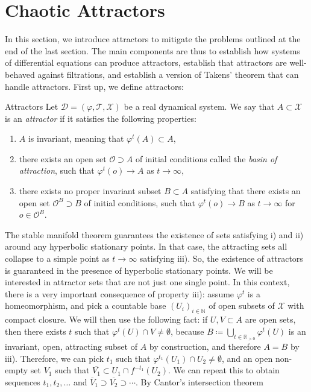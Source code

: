 \documentclass[11pt, a4paper]{memoir}
\theoremstyle{break}
\theoremstyle{break}
\theoremstyle{nonumberplain}
\newcommand{\mN}{\mathbb{N}}
\newcommand{\mR}{\mathbb{R}}
\begin{document}
\section{Chaotic Attractors}
In this section, we introduce attractors to mitigate the problems outlined at the end of the last section. The main components are thus to establish how systems of differential equations can produce attractors, establish that attractors are well-behaved against filtrations, and establish a version of Takens' theorem that can handle attractors. First up, we define attractors:
\begin{mydefinition}{Attractors}
Let $\mathcal{D}=(\varphi,\mathcal{T},\mathcal{X})$ be a real dynamical system. We say that $A\subset \mathcal{X}$ is an \emph{attractor} if it satisfies the following properties:
\begin{enumerate}[label=\roman*)]
	\item $A$ is invariant, meaning that $\varphi^t(A)\subset A$,
	\item there exists an open set $\mathcal{O}\supset A$ of initial conditions called the \emph{basin of attraction}, such that $\varphi^t(o)\to A$ as $t\to \infty$,
	\item there exists no proper invariant subset $B\subset A$ satisfying that there exists an open set $\mathcal{O}^B\supset B$ of initial conditions, such that $\varphi^t(o)\to B$ as $t\to \infty$ for $o\in \mathcal{O}^B$.
\end{enumerate}
\end{mydefinition}
The stable manifold theorem guarantees the existence of sets satisfying i) and ii) around any hyperbolic stationary points. In that case, the attracting sets all collapse to a simple point as $t\to\infty$ satisfying iii). So, the existence of attractors is guaranteed in the presence of hyperbolic stationary points. We will be interested in attractor sets that are not just one single point. In this context, there is a very important consequence of property iii): assume $\varphi^t$ is a homeomorphism, and pick a countable base $(U_i)_{i\in \mN}$ of open subsets of $\mathcal{X}$ with compact closure. We will then use the following fact: if $U,V\subset A$ are open sets, then there exists $t$ such that $\varphi^{t}(U)\cap V\neq \emptyset$, because $B\coloneqq \bigcup_{t\in \mR_{>0}}\varphi^{t}(U)$ is an invariant, open, attracting subset of $A$ by construction, and therefore $A=B$ by iii). Therefore, we can pick $t_1$ such that $\varphi^{t_1}(U_1)\cap U_2\neq\emptyset$, and an open non-empty set $V_1$ such that $\overline{V_1}\subset U_1\cap f^{-t_1}(U_2)$. We can repeat this to obtain sequences $t_1,t_2,\ldots$ and $\overline{V}_1\supset \overline{V_2}\supset\cdots$. By Cantor's intersection theorem
\end{document}
